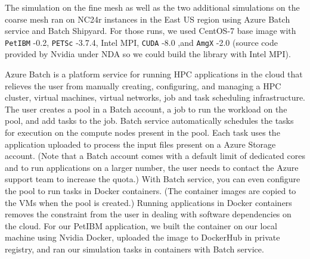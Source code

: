 \documentclass[12pt]{article}
\newcommand{\petibm}{\texttt{PetIBM} }
\newcommand{\petsc}{\texttt{PETSc} }
\newcommand{\cuda}{\texttt{CUDA} }
\newcommand{\amgx}{\texttt{AmgX} }
\begin{document}
The simulation on the fine mesh as well as the two additional simulations on the coarse mesh ran on NC24r instances in the East US region using Azure Batch service and Batch Shipyard.
For those runs, we used CentOS-7 base image with \petibm-0.2, \petsc-3.7.4, Intel MPI, \cuda-8.0 ,and \amgx-2.0 (source code provided by Nvidia under NDA so we could build the library with Intel MPI).

Azure Batch is a platform service for running HPC applications in the cloud that relieves the user from manually creating, configuring, and managing a HPC cluster, virtual machines, virtual networks, job and task scheduling infrastructure.
The user creates a pool in a Batch account, a job to run the workload on the pool, and add tasks to the job.
Batch service automatically schedules the tasks for execution on the compute nodes present in the pool.
Each task uses the application uploaded to process the input files present on a Azure Storage account.
(Note that a Batch account comes with a default limit of dedicated cores and to run applications on a larger number, the user needs to contact the Azure support team to increase the quota.)
With Batch service, you can even configure the pool to run tasks in Docker containers.
(The container images are copied to the VMs when the pool is created.)
Running applications in Docker containers removes the constraint from the user in dealing with software dependencies on the cloud.
For our PetIBM application, we built the container on our local machine using Nvidia Docker, uploaded the image to DockerHub in private registry, and ran our simulation tasks in containers with Batch service.
\end{document}
